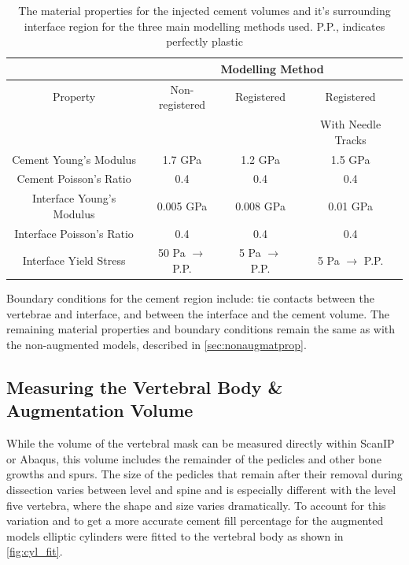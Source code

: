 \begin{table}[h]
\centering
\caption{The material properties for the injected cement volumes and it's
	surrounding interface region for the three main modelling methods
used. P.P., indicates perfectly plastic}
\label{tab:matprops4cmt}
\begin{tabular}{c|c|c|c}
               & \multicolumn{3}{c}{Modelling Method}				\\
	\hline 
	Property	       & Non-registered & Registered & Registered  \\ 
			       &		&	     & With Needle
	Tracks \\ \hline \hline
Cement Young's Modulus    &1.7 GPa            & 1.2 GPa       & 1.5 GPa \\
Cement Poisson's Ratio    &0.4                & 0.4           &0.4  \\ \hline
Interface Young's Modulus & 0.005 GPa          & 0.008 GPa      &0.01 GPa \\ 
Interface Poisson's Ratio & 0.4               & 0.4           & 0.4\\ 
Interface Yield Stress	  & 50 Pa $\rightarrow$ P.P.      & 5 Pa $\rightarrow$
P.P.  & 5 Pa $\rightarrow$ P.P.
\\ \hline
\end{tabular}
\end{table}

Boundary conditions for the cement region include: tie contacts between the
vertebrae and interface, and between the interface and the cement volume.
The remaining material properties and boundary conditions remain the same as
with the non-augmented models, described in \cref{sec:nonaugmatprop}.

\subsection{Measuring the Vertebral Body \& Augmentation Volume}

While the volume of the vertebral mask can be measured directly within ScanIP
or Abaqus, this volume includes the remainder of the pedicles and other bone growths and spurs.
The size of the pedicles that remain after their removal during dissection
varies between level and spine and is especially different with the level five
vertebra, where the shape and size varies dramatically.
To account for this variation and to get a more accurate cement fill percentage
for the augmented models elliptic cylinders were fitted to the vertebral body
as shown in \cref{fig:cyl_fit}.



